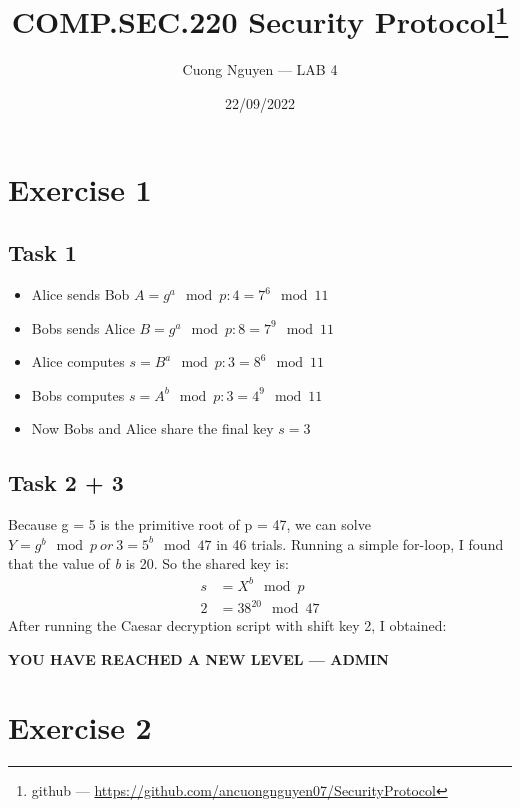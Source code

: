 \documentclass{article}
\title{COMP.SEC.220 Security Protocol\footnote{github --- \url{https://github.com/ancuongnguyen07/SecurityProtocol}}}
\author{Cuong Nguyen --- LAB 4}
\date{22/09/2022}
\begin{document}
    
\maketitle

\section*{Exercise 1}

\subsection*{Task 1}
%
\begin{itemize}
    \item Alice sends Bob \(A = g^{a} \mod p: 4 = 7^{6} \mod 11\)
    \item Bobs sends Alice \(B = g^{a} \mod p: 8 = 7^{9}  \mod 11\)
    \item Alice computes \(s = B^{a} \mod p: 3 = 8^{6} \mod 11\)
    \item Bobs computes \(s = A^{b} \mod p: 3 = 4^{9} \mod 11\)
    \item Now Bobs and Alice share the final key \(s = 3\)
\end{itemize}

\subsection*{Task 2 + 3}
%
Because g = 5 is the primitive root of p = 47, we can solve \(Y = g^{b}
\mod p\ or\ 3 = 5^{b} \mod 47\) in 46 trials. Running a simple for-loop,
I found that the value of \emph{b} is 20. So the shared key is:
\begin{align*}
    s &= X^{b} \mod p \\
    2 &= 38^{20} \mod 47
\end{align*}
After running the Caesar decryption script with shift key 2, I obtained:
\begin{center}
    \textbf{YOU HAVE REACHED A NEW LEVEL --- ADMIN}
\end{center}

\section*{Exercise 2}
%
\end{document}
